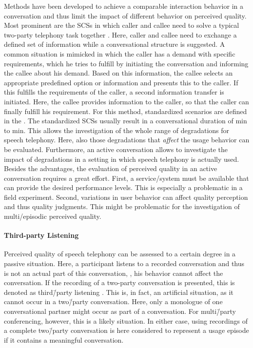 Methods have been developed to achieve a comparable interaction behavior in a conversation and thus limit the impact of different behavior on perceived quality.
Most prominent are the \acfp{SCS} in which caller and callee need to solve a typical two-party telephony task together \citep[][p.\,76]{moller_assessment_2000}.
Here, caller and callee need to exchange a defined set of information while a conversational structure is suggested.
A common situation is mimicked in which the caller has a demand with specific requirements, which he tries to fulfill by initiating the conversation and informing the callee about his demand.
Based on this information, the callee selects an appropriate predefined option or information and presents this to the caller.
If this fulfills the requirements of the caller, a second information transfer is initiated.
Here, the callee provides information to the caller, so that the caller can finally fulfill his requirement.
For this method, standardized scenarios are defined in the \citet{itu-t_recommendation_p.805_subjective_2007}.
The standardized \acp{SCS} usually result in a conversational duration of \unit[3]{min} to \unit[7]{min}.
This allows the investigation of the whole range of degradations for speech telephony.
Here, also those degradations that \emph{affect} the usage behavior can be evaluated. %
Furthermore, an active conversation allows to investigate the impact of degradations in a setting in which speech telephony is actually used.
Besides the advantages, the evaluation of perceived quality in an active conversation requires a great effort.
First, a service/system must be available that can provide the desired performance levels.
This is especially a problematic in a field experiment.
Second, variations in user behavior can affect quality perception and thus quality judgments.
This might be problematic for the investigation of multi\-/episodic perceived quality.

\paragraph*{Third-party Listening}
Perceived quality of speech telephony can be assessed  to a certain degree in a passive situation.
Here, a participant listens to a recorded conversation and thus is not an actual part of this conversation, \ie, his behavior cannot affect the conversation.
If the recording of a two-party conversation is presented, this is denoted as third\=/party listening \citep[][p.\,13]{itu-t_recommendation_p.832_subjective_2000}.
This is, in fact, an artificial situation, as it cannot occur in a two\=/party conversation.
Here, only a monologue of one conversational partner might occur as part of a conversation.
For multi\=/party conferencing, however, this is a likely situation.
In either case, using recordings of a complete two\=/party conversation is here considered to represent a usage episode if it contains a meaningful conversation.

